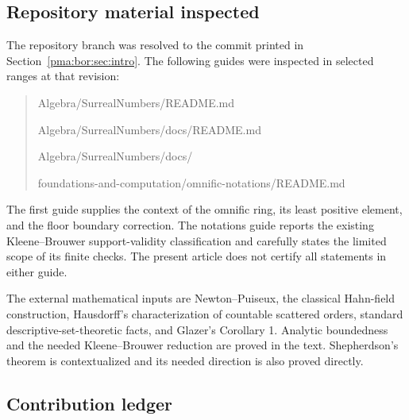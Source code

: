 \documentclass[11pt]{article}
\numberwithin{equation}{section}
\theoremstyle{definition}
\theoremstyle{remark}
\begin{document}
\subsection{Repository material inspected}

The repository branch was resolved to the commit printed in
Section~\ref{pma:bor:sec:intro}. The following guides were inspected in selected ranges at that revision:
\begin{quote}\small\ttfamily
Algebra/SurrealNumbers/README.md\par
Algebra/SurrealNumbers/docs/README.md\par
Algebra/SurrealNumbers/docs/\par
\quad foundations-and-computation/omnific-notations/README.md
\end{quote}
The first guide supplies the context of the omnific ring, its least positive
element, and the floor boundary correction. The notations guide reports the
existing Kleene--Brouwer support-validity classification and carefully states
the limited scope of its finite checks. The present article does not certify
all statements in either guide.

The external mathematical inputs are Newton--Puiseux, the classical Hahn-field
construction, Hausdorff's characterization of countable scattered orders,
standard descriptive-set-theoretic facts, and Glazer's Corollary 1.
Analytic boundedness and the needed Kleene--Brouwer reduction are proved in
the text. Shepherdson's theorem is contextualized and its needed direction
is also proved directly.

\subsection{Contribution ledger}
\end{document}
